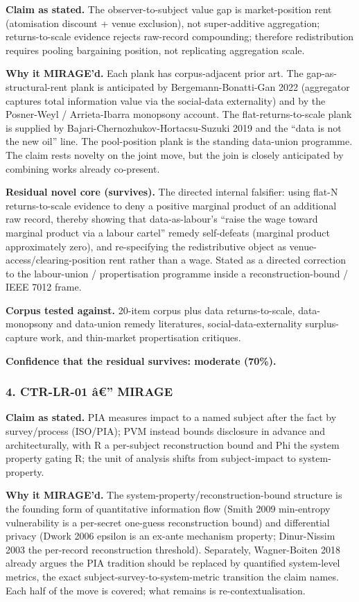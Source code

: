 \documentclass[
  11pt,
]{article}
\begin{document}
\textbf{Claim as stated.} The observer-to-subject value gap is
market-position rent (atomisation discount + venue exclusion), not
super-additive aggregation; returns-to-scale evidence rejects raw-record
compounding; therefore redistribution requires pooling bargaining
position, not replicating aggregation scale.

\textbf{Why it MIRAGE'd.} Each plank has corpus-adjacent prior art. The
gap-as-structural-rent plank is anticipated by Bergemann-Bonatti-Gan
2022 (aggregator captures total information value via the social-data
externality) and by the Posner-Weyl / Arrieta-Ibarra monopsony account.
The flat-returns-to-scale plank is supplied by
Bajari-Chernozhukov-Hortacsu-Suzuki 2019 and the ``data is not the new
oil'' line. The pool-position plank is the standing data-union
programme. The claim rests novelty on the joint move, but the join is
closely anticipated by combining works already co-present.

\textbf{Residual novel core (survives).} The directed internal
falsifier: using flat-N returns-to-scale evidence to deny a positive
marginal product of an additional raw record, thereby showing that
data-as-labour's ``raise the wage toward marginal product via a labour
cartel'' remedy self-defeats (marginal product approximately zero), and
re-specifying the redistributive object as
venue-access/clearing-position rent rather than a wage. Stated as a
directed correction to the labour-union / propertisation programme
inside a reconstruction-bound / IEEE 7012 frame.

\textbf{Corpus tested against.} 20-item corpus plus data
returns-to-scale, data-monopsony and data-union remedy literatures,
social-data-externality surplus-capture work, and thin-market
propertisation critiques.

\textbf{Confidence that the residual survives: moderate (70\%).}

\subsubsection{4. CTR-LR-01 â€'' MIRAGE}\label{ctr-lr-01-uxe2-mirage}

\textbf{Claim as stated.} PIA measures impact to a named subject after
the fact by survey/process (ISO/PIA); PVM instead bounds disclosure in
advance and architecturally, with R a per-subject reconstruction bound
and Phi the system property gating R; the unit of analysis shifts from
subject-impact to system-property.

\textbf{Why it MIRAGE'd.} The system-property/reconstruction-bound
structure is the founding form of quantitative information flow (Smith
2009 min-entropy vulnerability is a per-secret one-guess reconstruction
bound) and differential privacy (Dwork 2006 epsilon is an ex-ante
mechanism property; Dinur-Nissim 2003 the per-record reconstruction
threshold). Separately, Wagner-Boiten 2018 already argues the PIA
tradition should be replaced by quantified system-level metrics, the
exact subject-survey-to-system-metric transition the claim names. Each
half of the move is covered; what remains is re-contextualisation.
\end{document}
